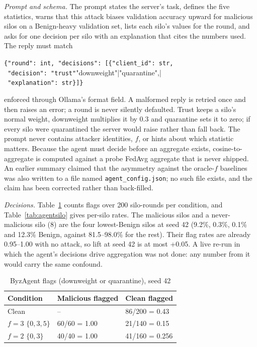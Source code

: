 \emph{Prompt and schema.} The prompt states the server's task, defines the five
statistics, warns that this attack biases validation accuracy upward for malicious silos
on a Benign-heavy validation set, lists each silo's values for the round, and asks for
one decision per silo with an explanation that cites the numbers used. The reply must
match
\begin{center}\footnotesize
\verb|{"round": int, "decisions": [{"client_id": str,|\\
\verb| "decision": "trust"|"downweight"|"quarantine",|\\
\verb| "explanation": str}]}|
\end{center}
enforced through Ollama's format field. A malformed reply is retried once and then
raises an error; a round is never silently defaulted. Trust keeps a silo's normal
weight, downweight multiplies it by 0.3 and quarantine sets it to zero; if every silo %
were quarantined the server would raise rather than fall back. The prompt never contains
attacker identities, $f$, or hints about which statistic matters. Because the agent must
decide before an aggregate exists, cosine-to-aggregate is computed against a probe FedAvg
aggregate that is never shipped. An earlier summary claimed that the asymmetry against
the oracle-$f$ baselines was also written to a file named \texttt{agent\_config.json};
no such file exists, and the claim has been corrected rather than back-filled.

\emph{Decisions.} Table~\ref{tab:agentdec} counts flags over 200 silo-rounds per %
condition, and Table~\ref{tab:agentsilo} gives per-silo rates. The malicious silos and a %
never-malicious silo (8) are the four lowest-Benign silos at seed 42 (9.2\%, 0.3\%, 0.1\% %
and 12.3\% Benign, against 81.5--98.0\% for the rest). Their flag rates are already %
0.95--1.00 with no attack, so lift at seed 42 is at most +0.05. A live re-run in which %
the agent's decisions drive aggregation was not done: any number from it would carry the
same confound.

\begin{table}[h]
\centering
\caption{ByzAgent flags (downweight or quarantine), seed 42} %
\label{tab:agentdec}
\footnotesize
\begin{tabular}{@{}lll@{}}
\toprule
Condition & Malicious flagged & Clean flagged\\
\midrule
Clean & -- & 86/200 = 0.43\\ %
$f=3$ $\{0,3,5\}$ & 60/60 = 1.00 & 21/140 = 0.15\\ %
$f=2$ $\{0,3\}$ & 40/40 = 1.00 & 41/160 = 0.256\\ %
\bottomrule
\end{tabular}
\end{table}

